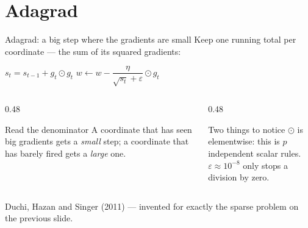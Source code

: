\documentclass[aspectratio=169]{beamer}
\begin{document}
\section{Adagrad}
\label{sec:adagrad}

\begin{frame}[shrink=6]{Adagrad: a big step where the gradients are small}
  Keep one running total per coordinate --- the sum of its squared gradients:
  \begin{center}\Large
    $s_t = s_{t-1} + g_t \odot g_t$ \qquad
    $w \leftarrow w - \dfrac{\eta}{\sqrt{s_t} + \varepsilon}\odot g_t$
  \end{center}
  \vspace{0.5em}
  \begin{columns}[T]
    \begin{column}{0.48\textwidth}
      \begin{block}{Read the denominator}
        A coordinate that has seen big gradients gets a \emph{small} step; a
        coordinate that has barely fired gets a \emph{large} one.
      \end{block}
    \end{column}
    \begin{column}{0.48\textwidth}
      \begin{block}{Two things to notice}
        $\odot$ is elementwise: this is $p$ independent scalar rules.\\[0.3em]
        $\varepsilon \approx 10^{-8}$ only stops a division by zero.
      \end{block}
    \end{column}
  \end{columns}
  \vspace{0.3em}
  \begin{center}\small
    Duchi, Hazan and Singer (2011) --- invented for exactly the sparse problem
    on the previous slide.
  \end{center}
\end{frame}
\end{document}
